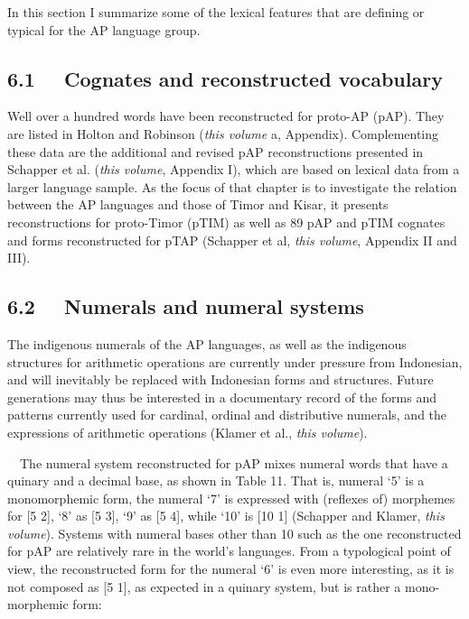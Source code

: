 
In this section I summarize some of the lexical features that are defining or typical for the AP language group. 

\subsection[6.1 \ \ Cognates and reconstructed vocabulary ]{6.1 \ \ Cognates and reconstructed vocabulary }
Well over a hundred words have been reconstructed for proto-AP (pAP). They are listed in Holton and Robinson (\textit{this volume} a, Appendix). Complementing these data are the additional and revised pAP reconstructions presented in Schapper et al. (\textit{this volume}, Appendix I), which are based on lexical data from a larger language sample. As the focus of that chapter is to investigate the relation between the AP languages and those of Timor and Kisar, it presents reconstructions for proto-Timor (pTIM) as well as 89 pAP and pTIM cognates and forms reconstructed for pTAP (Schapper et al, \textit{this volume}, Appendix II and III).

\subsection[6.2 \ \ Numerals and numeral systems]{6.2 \ \ Numerals and numeral systems}
The indigenous numerals of the AP languages, as well as the indigenous structures for arithmetic operations are currently under pressure from Indonesian, and will inevitably be replaced with Indonesian forms and structures. Future generations may thus be interested in a documentary record of the forms and patterns currently used for cardinal, ordinal and distributive numerals, and the expressions of arithmetic operations (Klamer et al., \textit{this volume}). 

\ \ The numeral system reconstructed for pAP mixes numeral words that have a quinary and a decimal base, as shown in Table 11. That is, numeral {\textquoteleft}5{\textquoteright} is a monomorphemic form, the numeral {\textquoteleft}7{\textquoteright} is expressed with (reflexes of) morphemes for [5 2], {\textquoteleft}8{\textquoteright} as  [5 3], {\textquoteleft}9{\textquoteright} as [5 4], while {\textquoteleft}10{\textquoteright} is [10 1] (Schapper and Klamer, \textit{this volume}). Systems with numeral bases other than 10 such as the one reconstructed for pAP are relatively rare in the world{\textquoteright}s languages. From a typological point of view, the reconstructed form for the numeral {\textquoteleft}6{\textquoteright} is even more interesting, as it is not composed as [5 1], as expected in a quinary system, but is rather a mono-morphemic form:

